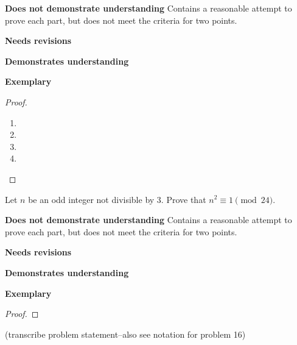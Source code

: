 \documentclass[letterpaper, 11pt]{../ximera}
\begin{document}
\begin{writeRubric}
    \item \textbf{Does not demonstrate understanding}
     Contains a reasonable attempt to prove each part, but does not meet the criteria for two points.
    \item \textbf{Needs revisions}
     
    \item \textbf{Demonstrates understanding}
    
    \item \textbf{Exemplary}
        
\end{writeRubric}
                                       \begin{proof}
   	\begin{enumerate}[label=(\alph*)] 
		\item %

		\item %
		
		\item %

		\item %
	\end{enumerate}
\end{proof}

\begin{ex}
Let $n$ be an odd integer not divisible by $3.$ Prove that $n^2\equiv 1\pmod{24}.$
\end{ex}

\begin{writeRubric}
    \item \textbf{Does not demonstrate understanding}
     Contains a reasonable attempt to prove each part, but does not meet the criteria for two points.
    \item \textbf{Needs revisions}
     
    \item \textbf{Demonstrates understanding}
    
    \item \textbf{Exemplary}
        
\end{writeRubric}
                                       \begin{proof}
 
\end{proof}


\begin{ex}
(transcribe problem statement--also see notation for problem 16)
\end{ex}
\end{document}
